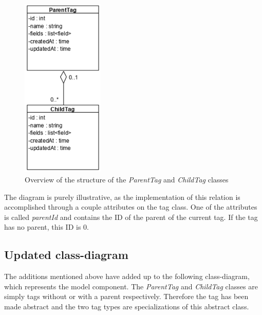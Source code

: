 \begin{figure}[H]
    \centering
    \includegraphics[width=0.35\textwidth]{figures/Structures/TagHierarchy.png}
    \caption{Overview of the structure of the \textit{ParentTag} and \textit{ChildTag} classes}
    \label{fig:TagHierarchy}
\end{figure}

The diagram is purely illustrative, as the implementation of this relation is accomplished through a couple attributes on the tag class. One of the attributes is called \textit{parentId} and contains the ID of the parent of the current tag. If the tag has no parent, this ID is 0.

\subsection{Updated class-diagram}
The additions mentioned above have added up to the following class-diagram, which represents the model component. The \textit{ParentTag} and \textit{ChildTag} classes are simply tags without or with a parent respectively. Therefore the tag has been made abstract and the two tag types are specializations of this abstract class.

